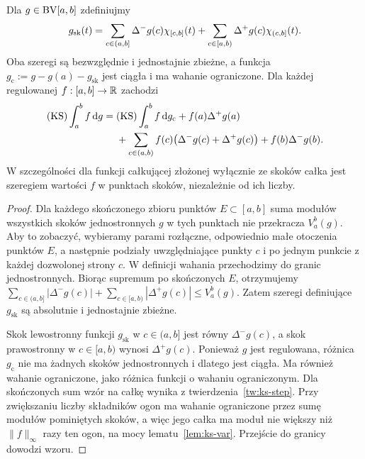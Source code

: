 \begin{twierdzenie}
\label{tw:ks-bv-split}
Dla $g\in\mathrm{BV}[a,b]$ zdefiniujmy
\[
 g_{\mathrm{sk}}(t)=
 \sum_{c\in(a,b]}\Delta^-g(c)\chi_{[c,b]}(t)
 +\sum_{c\in[a,b)}\Delta^+g(c)\chi_{(c,b]}(t).
\]
Oba szeregi są bezwzględnie i jednostajnie zbieżne, a funkcja $g_{\mathrm c}:=g-g(a)-g_{\mathrm{sk}}$ jest ciągła i ma wahanie ograniczone. Dla każdej regulowanej $f:[a,b]\to\mathbb R$ zachodzi
\[
 \begin{aligned}
 (\mathrm{KS})\int_a^b f\,\mathrm dg
 ={}&(\mathrm{KS})\int_a^b f\,\mathrm dg_{\mathrm c}
 +f(a)\Delta^+g(a)\\
 &+\sum_{c\in(a,b)}f(c)\bigl(\Delta^-g(c)+\Delta^+g(c)\bigr)
 +f(b)\Delta^-g(b).
 \end{aligned}
\]
W szczególności dla funkcji całkującej złożonej wyłącznie ze skoków całka jest szeregiem wartości $f$ w punktach skoków, niezależnie od ich liczby.
\end{twierdzenie}
\begin{proof}
Dla każdego skończonego zbioru punktów $E\subset[a,b]$ suma modułów wszystkich skoków jednostronnych $g$ w tych punktach nie przekracza $V_a^b(g)$. Aby to zobaczyć, wybieramy parami rozłączne, odpowiednio małe otoczenia punktów $E$, a następnie podziały uwzględniające punkty $c$ i po jednym punkcie z każdej dozwolonej strony $c$. W definicji wahania przechodzimy do granic jednostronnych. Biorąc supremum po skończonych $E$, otrzymujemy
$\sum_{c\in(a,b]}|\Delta^-g(c)|+\sum_{c\in[a,b)}|\Delta^+g(c)|\le V_a^b(g)$. Zatem szeregi definiujące $g_{\mathrm{sk}}$ są absolutnie i jednostajnie zbieżne.

Skok lewostronny funkcji $g_{\mathrm{sk}}$ w $c\in(a,b]$ jest równy $\Delta^-g(c)$, a skok prawostronny w $c\in[a,b)$ wynosi $\Delta^+g(c)$. Ponieważ $g$ jest regulowana, różnica $g_{\mathrm c}$ nie ma żadnych skoków jednostronnych i dlatego jest ciągła. Ma również wahanie ograniczone, jako różnica funkcji o wahaniu ograniczonym. Dla skończonych sum wzór na całkę wynika z twierdzenia~\ref{tw:ks-step}. Przy zwiększaniu liczby składników ogon ma wahanie ograniczone przez sumę modułów pominiętych skoków, a więc jego całka ma moduł nie większy niż $\|f\|_\infty$ razy ten ogon, na mocy lematu~\ref{lem:ks-var}. Przejście do granicy dowodzi wzoru.
\end{proof}

